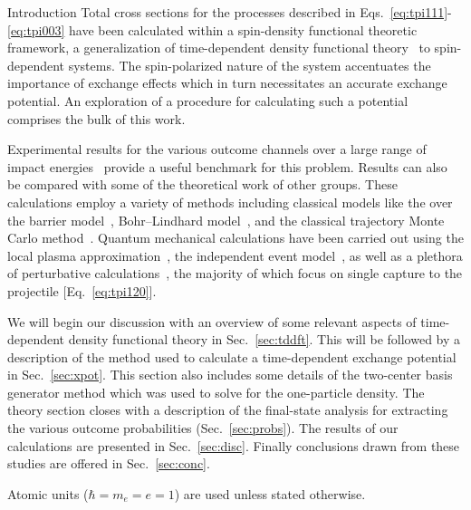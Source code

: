 \documentclass[aps, pra, reprint, groupedaddress, amsfonts,
               amsmath, amssymb, showpacs, nofootinbib]{revtex4-1}
\begin{document}
\begin{section}{Introduction \label{sec:intro}}
   Total cross sections for the processes described in Eqs.~\eqref{eq:tpi111}-\eqref{eq:tpi003} have
   been calculated within a spin-density functional theoretic~\cite{td-spindep} framework, a
   generalization of time-dependent density functional theory~\cite{tddft, ullrich} to spin-dependent
   systems. The spin-polarized nature of the system accentuates the importance of exchange effects
   which in turn necessitates an accurate exchange potential. An exploration of a procedure for
   calculating such a potential comprises the bulk of this work.

   Experimental results for the various outcome channels over a large range of impact
   energies~\cite{BS58, HN78, HSE78, dCFdP88, DT-88, Dub-89, ASL91, FTFHLP-95, SSMSM-11} provide a
   useful benchmark for this problem. Results can also be compared with some of the theoretical work of
   other groups. These calculations employ a variety of methods including classical models like the
   over the barrier model~\cite{CC-07}, Bohr–Lindhard model~\cite{DYC-08, DLZ-12}, and the classical
   trajectory Monte Carlo method~\cite{GMZ17}. Quantum mechanical calculations have been carried out
   using the local plasma approximation~\cite{MMA03}, the independent event model~\cite{SM-03}, as well
   as a plethora of perturbative calculations~\cite{Mancev96, BOC05, Mancev-07, MG-10, NTC11, GG-12b,
   GAG15}, the majority of which focus on single capture to the projectile [Eq.~\eqref{eq:tpi120}].

   We will begin our discussion with an overview of some relevant aspects of time-dependent density
   functional theory in Sec.~\ref{sec:tddft}. This will be followed by a description of the method used
   to calculate a time-dependent exchange potential in Sec.~\ref{sec:xpot}. This section also includes
   some details of the two-center basis generator method which was used to solve for the one-particle
   density. The theory section closes with a description of the final-state analysis for extracting
   the various outcome probabilities (Sec.~\ref{sec:probs}). The results of our calculations are
   presented in Sec.~\ref{sec:disc}. Finally conclusions drawn from these studies are offered in
   Sec.~\ref{sec:conc}.

   Atomic units ($\hbar = m_e = e = 1$) are used unless stated otherwise.

\end{section}
\end{document}
